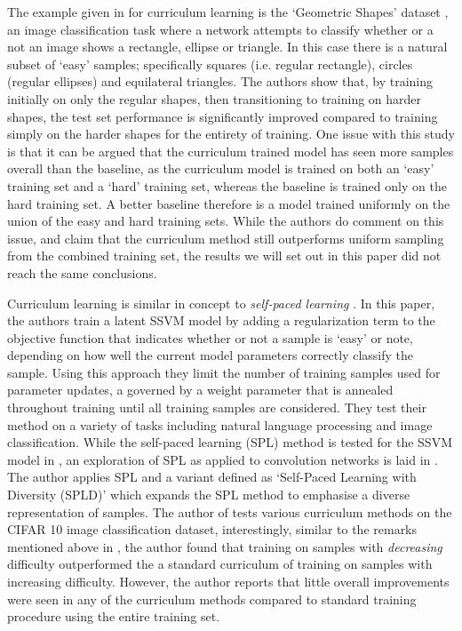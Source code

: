 The example given in \cite{Bengio2009}  for curriculum learning is the `Geometric Shapes' dataset \cite{GeoShapes}, an image classification task where a network attempts to classify whether or a not an image shows a rectangle, ellipse or triangle. In this case there is a natural subset of `easy' samples; specifically squares (i.e. regular rectangle), circles (regular ellipses) and equilateral triangles. The authors show that, by training initially on only the regular shapes, then transitioning to training on harder shapes, the test set performance is significantly improved compared to training simply on the harder shapes for the entirety of training. One issue with this study is that it can be argued that the curriculum trained model has seen more samples overall than the baseline, as the curriculum model is trained on both an `easy' training set and a `hard' training set, whereas the baseline is trained only on the hard training set. A better baseline therefore is a model trained uniformly on the union of the easy and hard training sets. While the authors do comment on this issue, and claim that the curriculum method still outperforms uniform sampling from the combined training set, the results we will set out in this paper did not reach the same conclusions. 

Curriculum learning is similar in concept to \textit{self-paced learning} \cite{kumar2010self}. In this paper, the authors train a latent SSVM model \cite{felzenszwalb2008discriminatively} by adding a regularization term to the objective function that indicates whether or not a sample is `easy' or note, depending on how well the current model parameters correctly classify the sample. Using this approach they limit the number of training samples used for parameter updates, a governed by a weight parameter that is annealed throughout training until all training samples are considered. They test their method on a variety of tasks including natural language processing and image classification. While the self-paced learning (SPL) method is tested for the SSVM model in \cite{kumar2010self}, an exploration of SPL as applied to convolution networks is laid in \cite{avramova2015curriculum}. The author applies SPL and a variant defined as `Self-Paced Learning with Diversity (SPLD)' \cite{jiang2014self} which expands the SPL method to emphasise a diverse representation of samples. The author of \cite{avramova2015curriculum} tests various curriculum methods on the CIFAR 10 image classification dataset, interestingly, similar to the remarks mentioned above in \cite{ELMAN199371}, the author found that training on samples with \textit{decreasing} difficulty outperformed the a standard curriculum of training on samples with increasing difficulty. However, the author reports that little overall improvements were seen in any of the curriculum methods compared to standard training procedure using the entire training set. 

